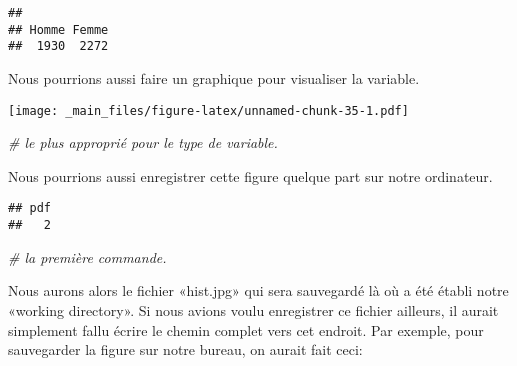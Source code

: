 \documentclass[
]{book}
\newenvironment{Shaded}{\begin{snugshade}}{\end{snugshade}}
\newcommand{\CommentTok}[1]{\textcolor[rgb]{0.56,0.35,0.01}{\textit{#1}}}
\newcommand{\FunctionTok}[1]{\textcolor[rgb]{0.00,0.00,0.00}{#1}}
\newcommand{\NormalTok}[1]{#1}
\newcommand{\SpecialCharTok}[1]{\textcolor[rgb]{0.00,0.00,0.00}{#1}}
\newcommand{\StringTok}[1]{\textcolor[rgb]{0.31,0.60,0.02}{#1}}
\begin{document}
\begin{verbatim}
## 
## Homme Femme 
##  1930  2272
\end{verbatim}

Nous pourrions aussi faire un graphique pour visualiser la variable.

\begin{Shaded}
\end{Shaded}

\texttt{[image: \_main\_files/figure-latex/unnamed-chunk-35-1.pdf]}

\begin{Shaded}
\begin{Highlighting}[]
\CommentTok{\# le plus approprié pour le type de variable.}
\end{Highlighting}
\end{Shaded}

Nous pourrions aussi enregistrer cette figure quelque part sur notre ordinateur.

\begin{Shaded}
\end{Shaded}

\begin{verbatim}
## pdf 
##   2
\end{verbatim}

\begin{Shaded}
\begin{Highlighting}[]
\CommentTok{\# la première commande.}
\end{Highlighting}
\end{Shaded}

Nous aurons alors le fichier «hist.jpg» qui sera sauvegardé là où a été établi notre «working directory». Si nous avions voulu enregistrer ce fichier ailleurs, il aurait simplement fallu écrire le chemin complet vers cet endroit. Par exemple, pour sauvegarder la figure sur notre bureau, on aurait fait ceci:
\end{document}
